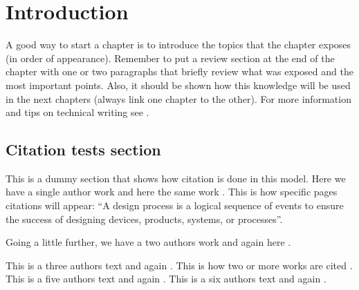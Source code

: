 \chapter{Introduction}
\label{chapter:introduction}

A good way to start a chapter is to introduce the topics that the chapter exposes (in order of appearance). Remember to put a review section at the end of the chapter with one or two paragraphs that briefly review what was exposed and the most important points. Also, it should be shown how this knowledge will be used in the next chapters (always link one chapter to the other). For more information and tips on technical writing see .

\section{Citation tests section}
\label{sec:citation_test}
This is a dummy section that shows how citation is done in this model. Here we have a single author work  and here the same work \cite{yan1999creative}. This is how specific pages citations will appear: ``A design process is a logical sequence of events to ensure the success of designing devices, products, systems, or processes''\cite[p.~14]{yan1999creative}.

Going a little further, we have a two authors work  and again here \cite{hartenberg1964kinematic}. 

This is a three authors text  and again \cite{srikrishnan2011robotics}. This is how two or more works are cited \cite{brown2007, solent2013}. This is a five authors text  and again \cite{zhao2009stitched}. This is a six authors text  and again  \cite{saadi2006tratamento}.

